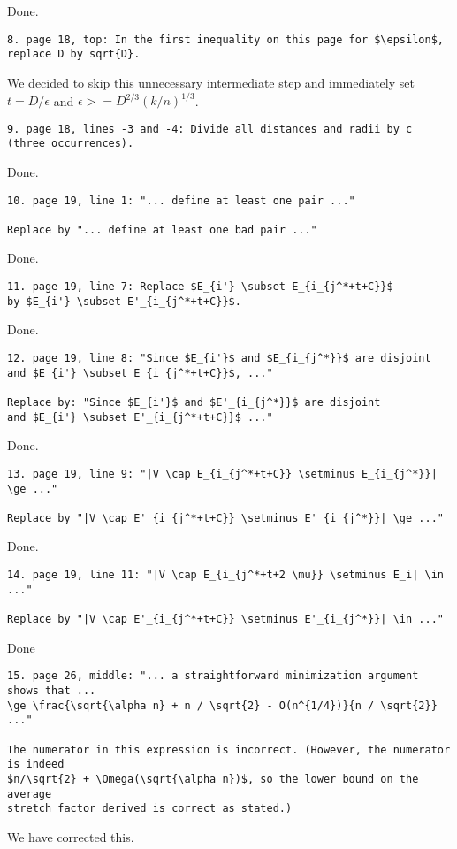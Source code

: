 \documentclass{patmorin}
\begin{document}
Done.

\begin{verbatim}
8. page 18, top: In the first inequality on this page for $\epsilon$,
replace D by sqrt{D}.
\end{verbatim}

We decided to skip this unnecessary intermediate step and immediately set $t=D/\epsilon$ and $\epsilon >= D^{2/3}(k/n)^{1/3}$.

\begin{verbatim}
9. page 18, lines -3 and -4: Divide all distances and radii by c (three occurrences).
\end{verbatim}

Done.

\begin{verbatim}
10. page 19, line 1: "... define at least one pair ..."

Replace by "... define at least one bad pair ..."
\end{verbatim}

Done.

\begin{verbatim}
11. page 19, line 7: Replace $E_{i'} \subset E_{i_{j^*+t+C}}$
by $E_{i'} \subset E'_{i_{j^*+t+C}}$.
\end{verbatim}


Done.

\begin{verbatim}
12. page 19, line 8: "Since $E_{i'}$ and $E_{i_{j^*}}$ are disjoint
and $E_{i'} \subset E_{i_{j^*+t+C}}$, ..."

Replace by: "Since $E_{i'}$ and $E'_{i_{j^*}}$ are disjoint
and $E_{i'} \subset E'_{i_{j^*+t+C}}$ ..."
\end{verbatim}

Done.

\begin{verbatim}
13. page 19, line 9: "|V \cap E_{i_{j^*+t+C}} \setminus E_{i_{j^*}}| \ge ..."

Replace by "|V \cap E'_{i_{j^*+t+C}} \setminus E'_{i_{j^*}}| \ge ..."
\end{verbatim}

Done.

\begin{verbatim}
14. page 19, line 11: "|V \cap E_{i_{j^*+t+2 \mu}} \setminus E_i| \in ..."

Replace by "|V \cap E'_{i_{j^*+t+C}} \setminus E'_{i_{j^*}}| \in ..."
\end{verbatim}

Done

\begin{verbatim}
15. page 26, middle: "... a straightforward minimization argument shows that ...
\ge \frac{\sqrt{\alpha n} + n / \sqrt{2} - O(n^{1/4})}{n / \sqrt{2}} ..."

The numerator in this expression is incorrect. (However, the numerator is indeed
$n/\sqrt{2} + \Omega(\sqrt{\alpha n})$, so the lower bound on the average
stretch factor derived is correct as stated.)
\end{verbatim}

We have corrected this.
\end{document}
